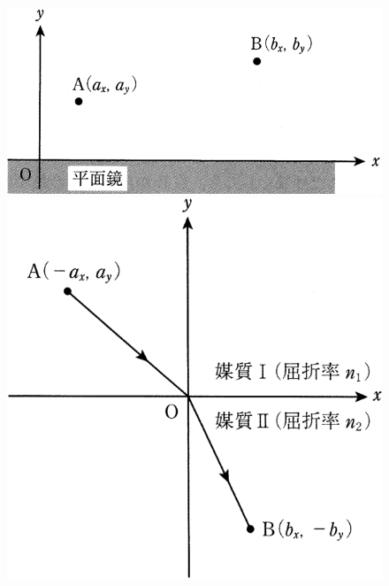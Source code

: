 \begin{figure}[H]
  \centering
  \begin{minipage}{.3\columnwidth}
    \includegraphics[width=\columnwidth]{../graphs/chiba_23_6-3.png}
    \caption{}
  \end{minipage}
  \hspace{.1\columnwidth}
  \begin{minipage}{.3\columnwidth}
    \centering
    \includegraphics[width=\columnwidth]{../graphs/chiba_23_6-4.png}
    \caption{} 
  \end{minipage}
\end{figure}

